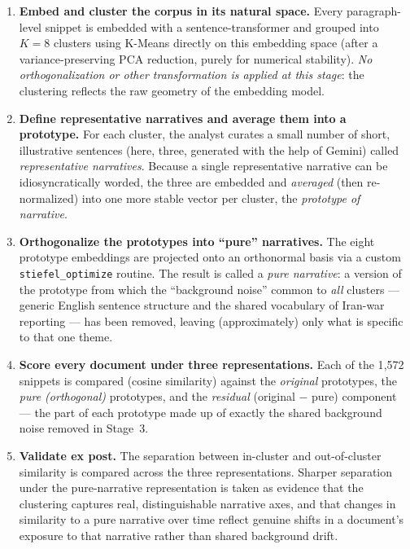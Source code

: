 \documentclass[11pt]{article}
\begin{document}
\begin{enumerate}[label=\textbf{Stage \arabic*.}, leftmargin=2.2cm]
    \item \textbf{Embed and cluster the corpus in its natural space.} Every paragraph-level snippet is embedded with a sentence-transformer and grouped into $K=8$ clusters using K-Means directly on this embedding space (after a variance-preserving PCA reduction, purely for numerical stability). \emph{No orthogonalization or other transformation is applied at this stage}: the clustering reflects the raw geometry of the embedding model.
    \item \textbf{Define representative narratives and average them into a prototype.} For each cluster, the analyst curates a small number of short, illustrative sentences (here, three, generated with the help of Gemini) called \emph{representative narratives}. Because a single representative narrative can be idiosyncratically worded, the three are embedded and \emph{averaged} (then re-normalized) into one more stable vector per cluster, the \emph{prototype of narrative}.
    \item \textbf{Orthogonalize the prototypes into ``pure'' narratives.} The eight prototype embeddings are projected onto an orthonormal basis via a custom \texttt{stiefel\_optimize} routine. The result is called a \emph{pure narrative}: a version of the prototype from which the ``background noise'' common to \emph{all} clusters --- generic English sentence structure and the shared vocabulary of Iran-war reporting --- has been removed, leaving (approximately) only what is specific to that one theme.
    \item \textbf{Score every document under three representations.} Each of the 1{,}572 snippets is compared (cosine similarity) against the \emph{original} prototypes, the \emph{pure (orthogonal)} prototypes, and the \emph{residual} (original $-$ pure) component --- the part of each prototype made up of exactly the shared background noise removed in Stage~3.
    \item \textbf{Validate ex post.} The separation between in-cluster and out-of-cluster similarity is compared across the three representations. Sharper separation under the pure-narrative representation is taken as evidence that the clustering captures real, distinguishable narrative axes, and that changes in similarity to a pure narrative over time reflect genuine shifts in a document's exposure to that narrative rather than shared background drift.
\end{enumerate}
\end{document}
